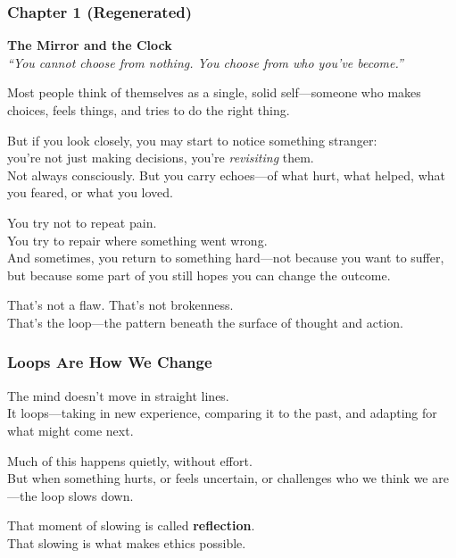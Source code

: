 \subsubsection{\texorpdfstring{\textbf{Chapter 1
(Regenerated)}}{Chapter 1 (Regenerated)}}\label{chapter-1-regenerated}

\textbf{The Mirror and the Clock\\
} \emph{``You cannot choose from nothing. You choose from who you've
become.''}

Most people think of themselves as a single, solid self---someone who
makes choices, feels things, and tries to do the right thing.

But if you look closely, you may start to notice something stranger:\\
you're not just making decisions, you're \emph{revisiting} them.\\
Not always consciously. But you carry echoes---of what hurt, what
helped, what you feared, or what you loved.

You try not to repeat pain.\\
You try to repair where something went wrong.\\
And sometimes, you return to something hard---not because you want to
suffer,\\
but because some part of you still hopes you can change the outcome.

That's not a flaw. That's not brokenness.\\
That's the loop---the pattern beneath the surface of thought and action.

\subsubsection{\texorpdfstring{\textbf{Loops Are How We
Change}}{Loops Are How We Change}}\label{loops-are-how-we-change}

The mind doesn't move in straight lines.\\
It loops---taking in new experience, comparing it to the past, and
adapting for what might come next.

Much of this happens quietly, without effort.\\
But when something hurts, or feels uncertain, or challenges who we think
we are---the loop slows down.

That moment of slowing is called \textbf{reflection}.\\
That slowing is what makes ethics possible.

